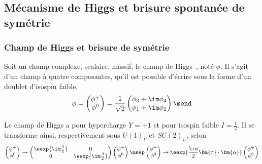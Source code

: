 \subsection{Mécanisme de Higgs et brisure spontanée de symétrie}\label{chapter-MS-MSSM-section-formalisme-subsec-Higgs_mechanism}
\subsubsection{Champ de Higgs et brisure de symétrie}\label{chapter-MS-MSSM-section-formalisme-subsec-Higgs_mechanism-subsubsec-potentiel}
Soit un champ complexe, scalaire, massif, le champ de Higgs~\cite{Englert_Brout,Higgs_1,Higgs_2,Guralnik_Hagen_Kibble,Kibble,Higgs_3}, noté $\phi$. Il s'agit d'un champ à quatre composantes, qu'il est possible d'écrire sous la forme d'un doublet d'isospin faible,
\begin{equation}
\phi
=
\begin{pmatrix}
\phi^+ \\ \phi^0
\end{pmatrix}
=
\frac{1}{\sqrt{2}}
\begin{pmatrix}
\phi_3 + \im \phi_4 \\ \phi_1 + \im \phi_2
\end{pmatrix}
\mend
\label{eq-chapter-MS-MSSM-section-formalisme-subsec-Higgs_mechanism-SM_Higgs_doublet}
\end{equation}
\par Le champ de Higgs a pour hypercharge $Y=+1$ et pour isospin faible $I=\frac{1}{2}$. Il se transforme ainsi, respectivement sous $U(1)_Y$ et $SU(2)_L$, selon
\begin{equation}
\begin{pmatrix}
\phi^+ \\ \phi^0
\end{pmatrix}
\to
\begin{pmatrix}
\eexp{\im\frac{\beta}{2}} & 0 \\ 0 & \eexp{\im\frac{\beta}{2}}
\end{pmatrix}
\begin{pmatrix}
\phi^+ \\ \phi^0
\end{pmatrix}
\msep
\begin{pmatrix}
\phi^+ \\ \phi^0
\end{pmatrix}
\to
\eexp{\frac{\im}{2}\bm{\tau}\cdot\bm{\alpha}}
\begin{pmatrix}
\phi^+ \\ \phi^0
\end{pmatrix}
\end{equation}
